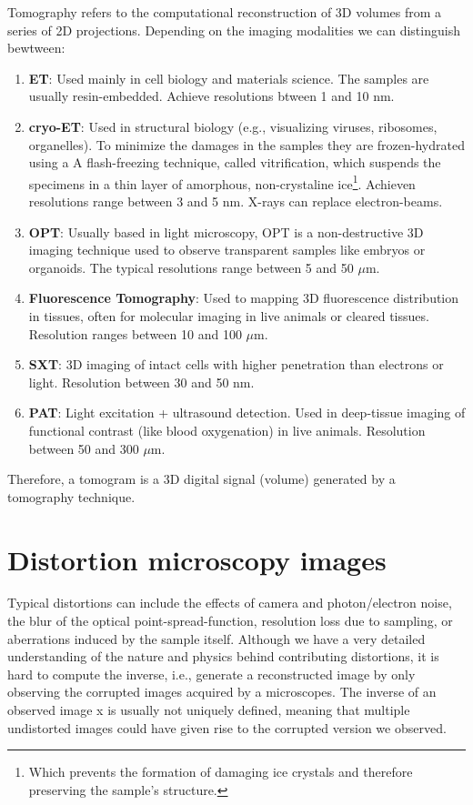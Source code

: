 Tomography refers to the computational reconstruction of 3D volumes
from a series of 2D projections. Depending on the imaging modalities
we can distinguish bewtween:
\begin{enumerate}
\item \textbf{\gls{ET}}: Used mainly in cell biology and materials
  science. The samples are usually resin-embedded. Achieve resolutions
  btween 1 and 10 nm.
\item \textbf{\gls{cryo-ET}}: Used in structural biology (e.g.,
  visualizing viruses, ribosomes, organelles). To minimize the damages
  in the samples they are frozen-hydrated using a A flash-freezing
  technique, called vitrification, which suspends the specimens in a
  thin layer of amorphous, non-crystaline ice\footnote{Which prevents
    the formation of damaging ice crystals and therefore preserving
    the sample's structure.}. Achieven resolutions range between 3 and
  5 nm. X-rays can replace electron-beams.
\item \textbf{\gls{OPT}}: Usually based in
  light microscopy, OPT is a non-destructive 3D imaging technique used
  to observe transparent samples like embryos or organoids. The
  typical resolutions range between 5 and 50 $\mu$m.
\item \textbf{Fluorescence Tomography}: Used to mapping 3D
  fluorescence distribution in tissues, often for molecular imaging in
  live animals or cleared tissues. Resolution ranges between 10 and
  100 $\mu$m.
\item \textbf{\gls{SXT}}: 3D imaging of intact cells with
  higher penetration than electrons or light. Resolution between 30
  and 50 nm.
\item \textbf{\gls{PAT}}: Light excitation + ultrasound
  detection. Used in deep-tissue imaging of functional contrast (like
  blood oxygenation) in live animals. Resolution between 50 and 300
  $\mu$m.
\end{enumerate}

Therefore, a tomogram is a 3D digital signal (volume) generated by a
tomography technique.


\section{Distortion microscopy images}
Typical distortions can include the effects of camera and
photon/electron noise, the blur of the optical point-spread-function,
resolution loss due to sampling, or aberrations induced by the sample
itself. Although we have a very detailed understanding of the nature
and physics behind contributing distortions, it is hard to compute the
inverse, i.e., generate a reconstructed image by only observing the
corrupted images acquired by a microscopes. The inverse of an observed
image x is usually not uniquely defined, meaning that multiple
undistorted images could have given rise to the corrupted version we
observed. %

